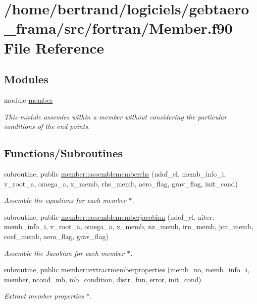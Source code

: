 \hypertarget{_member_8f90}{}\section{/home/bertrand/logiciels/gebtaero\+\_\+frama/src/fortran/\+Member.f90 File Reference}
\label{_member_8f90}
\subsection*{Modules}
\begin{DoxyCompactItemize}
\item 
module \hyperlink{namespacemember}{member}
\begin{DoxyCompactList}\small\item\em This module assemles within a member without considering the particular conditions of the end points. \end{DoxyCompactList}\end{DoxyCompactItemize}
\subsection*{Functions/\+Subroutines}
\begin{DoxyCompactItemize}
\item 
subroutine, public \hyperlink{namespacemember_ac35a49c8cdb17a8b26f8c4b23d6053be}{member\+::assemblememberrhs} (ndof\+\_\+el, memb\+\_\+info\+\_\+i, v\+\_\+root\+\_\+a, omega\+\_\+a, x\+\_\+memb, rhs\+\_\+memb, aero\+\_\+flag, grav\+\_\+flag, init\+\_\+cond)
\begin{DoxyCompactList}\small\item\em Assemble the equations for each member $\ast$. \end{DoxyCompactList}\item 
subroutine, public \hyperlink{namespacemember_ad1206aacf86963bb366e5976c4f605c2}{member\+::assemblememberjacobian} (ndof\+\_\+el, niter, memb\+\_\+info\+\_\+i, v\+\_\+root\+\_\+a, omega\+\_\+a, x\+\_\+memb, nz\+\_\+memb, irn\+\_\+memb, jcn\+\_\+memb, coef\+\_\+memb, aero\+\_\+flag, grav\+\_\+flag)
\begin{DoxyCompactList}\small\item\em Assemble the Jacobian for each member $\ast$. \end{DoxyCompactList}\item 
subroutine, public \hyperlink{namespacemember_a8618a013da87b108e5e91013028fc1a8}{member\+::extractmemberproperties} (memb\+\_\+no, memb\+\_\+info\+\_\+i, member, ncond\+\_\+mb, mb\+\_\+condition, distr\+\_\+fun, error, init\+\_\+cond)
\begin{DoxyCompactList}\small\item\em Extract member properties $\ast$. \end{DoxyCompactList}\end{DoxyCompactItemize}
